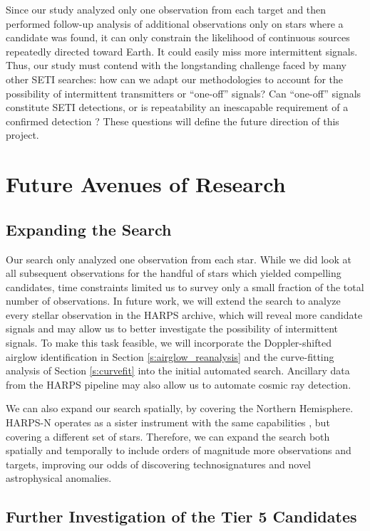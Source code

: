 \documentclass[twocolumn]{aastex701}
\begin{document}
Since our study analyzed only one observation from each target and then performed follow-up analysis of additional observations only on stars where a candidate was found, it can only constrain the likelihood of continuous sources repeatedly directed toward Earth.  It could easily miss more intermittent signals. Thus, our study must contend with the longstanding challenge faced by many other SETI searches: how can we adapt our methodologies to account for the possibility of intermittent transmitters or ``one-off'' signals?  Can ``one-off'' signals constitute SETI detections, or is repeatability an inescapable requirement of a confirmed detection \citep{2019nasatechnosignatures, Wow!Signal}? These questions will define the future direction of this project.


\section{Future Avenues of Research}
\subsection{Expanding the Search}
Our search only analyzed one observation from each star. While we did look at all subsequent observations for the handful of stars which yielded compelling candidates, time constraints limited us to survey only a small fraction of the total number of observations.  In future work, we will extend the search to analyze every stellar observation in the HARPS archive, which will reveal more candidate signals and may allow us to better investigate the possibility of intermittent signals. To make this task feasible, we will incorporate the Doppler-shifted airglow identification in Section \ref{s:airglow_reanalysis} and the curve-fitting analysis of Section \ref{s:curvefit} into the initial automated search. Ancillary data from the HARPS pipeline may also allow us to automate cosmic ray detection.

We can also expand our search spatially, by covering the Northern Hemisphere. HARPS-N operates as a sister instrument with the same capabilities \citep{HARPS_N}, but covering a different set of stars. Therefore, we can expand the search both spatially and temporally to include orders of magnitude more observations and targets, improving our odds of discovering technosignatures and novel astrophysical anomalies.

\subsection{Further Investigation of the Tier 5 Candidates}
\end{document}

